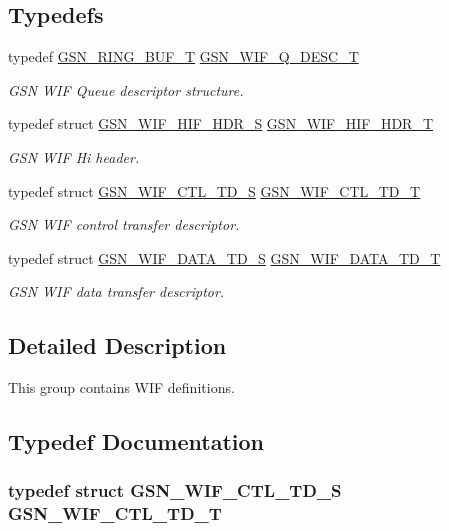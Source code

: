 \subsection*{Typedefs}
\begin{DoxyCompactItemize}
\item 
typedef \hyperlink{a00191}{GSN\_\-RING\_\-BUF\_\-T} \hyperlink{a00638_ga0cd2d946cd64e99973998fcac7dfc244}{GSN\_\-WIF\_\-Q\_\-DESC\_\-T}
\begin{DoxyCompactList}\small\item\em GSN WIF Queue descriptor structure. \end{DoxyCompactList}\item 
typedef struct \hyperlink{a00337}{GSN\_\-WIF\_\-HIF\_\-HDR\_\-S} \hyperlink{a00638_gaccb177e96466ed182b099685113c9f70}{GSN\_\-WIF\_\-HIF\_\-HDR\_\-T}
\begin{DoxyCompactList}\small\item\em GSN WIF Hi header. \end{DoxyCompactList}\item 
typedef struct \hyperlink{a00322}{GSN\_\-WIF\_\-CTL\_\-TD\_\-S} \hyperlink{a00638_ga4b386895f3f1c0f28cd895ffd1e5fdfb}{GSN\_\-WIF\_\-CTL\_\-TD\_\-T}
\begin{DoxyCompactList}\small\item\em GSN WIF control transfer descriptor. \end{DoxyCompactList}\item 
typedef struct \hyperlink{a00325}{GSN\_\-WIF\_\-DATA\_\-TD\_\-S} \hyperlink{a00638_ga906c7cc219265ee9c61f1487fcd1bfcd}{GSN\_\-WIF\_\-DATA\_\-TD\_\-T}
\begin{DoxyCompactList}\small\item\em GSN WIF data transfer descriptor. \end{DoxyCompactList}\end{DoxyCompactItemize}


\subsection{Detailed Description}
This group contains WIF definitions. 

\subsection{Typedef Documentation}
\hypertarget{a00638_ga4b386895f3f1c0f28cd895ffd1e5fdfb}{
\subsubsection[{GSN\_\-WIF\_\-CTL\_\-TD\_\-T}]{\setlength{\rightskip}{0pt plus 5cm}typedef struct {\bf GSN\_\-WIF\_\-CTL\_\-TD\_\-S}  {\bf GSN\_\-WIF\_\-CTL\_\-TD\_\-T}}}
\label{a00638_ga4b386895f3f1c0f28cd895ffd1e5fdfb}


